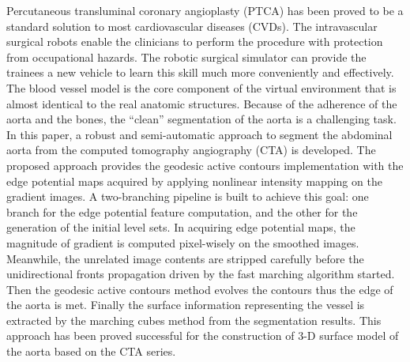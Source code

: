 
Percutaneous transluminal coronary angioplasty (PTCA) has been proved to be a standard solution to most cardiovascular diseases (CVDs).
The intravascular surgical robots enable the clinicians to perform the procedure with protection from occupational hazards.
The robotic surgical simulator can provide the trainees a new vehicle to learn this skill much more conveniently and effectively.
The blood vessel model is the core component of the virtual environment that is almost identical to the real anatomic structures.
Because of the adherence of the aorta and the bones, the ``clean'' segmentation of the aorta is a challenging task.
In this paper, a robust and semi-automatic approach to segment the abdominal aorta from the computed tomography angiography (CTA) is developed.
The proposed approach provides the geodesic active contours implementation with the edge potential maps acquired by applying nonlinear intensity mapping on the gradient images.
A two-branching pipeline is built to achieve this goal: one branch for the edge potential feature computation, and the other for the generation of the initial level sets.
In acquiring edge potential maps, the magnitude of gradient is computed pixel-wisely on the smoothed images.
Meanwhile, the unrelated image contents are stripped carefully before the unidirectional fronts propagation driven by the fast marching algorithm started.
Then the geodesic active contours method evolves the contours thus the edge of the aorta is met.
Finally the surface information representing the vessel is extracted by the marching cubes method from the segmentation results.
This approach has been proved successful for the construction of 3-D surface model of the aorta based on the CTA series.